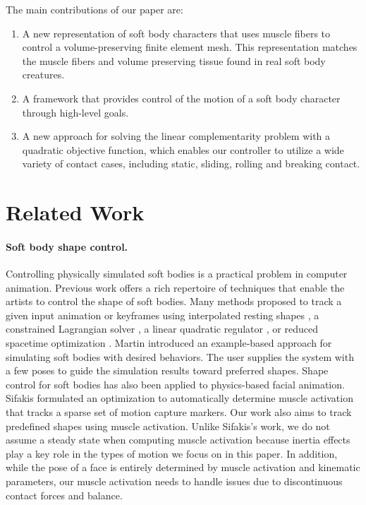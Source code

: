 The main contributions of our paper are:

\begin{enumerate}
\item A new representation of soft body characters that uses muscle fibers
to control a volume-preserving finite element mesh.  This representation
matches the muscle fibers and volume preserving tissue found in real soft
body creatures.
\item A framework that provides control of the motion of a
soft body character through high-level goals.
\item A new approach for solving the linear complementarity problem with a
quadratic objective function, which enables our controller to utilize a wide
variety of contact cases, including static, sliding, rolling and breaking
contact.
\end{enumerate}

\section{Related Work}

\paragraph{Soft body shape control.} Controlling physically simulated soft bodies is a practical problem in
computer animation. Previous work offers a rich repertoire of
techniques that enable the artists to control the shape of soft
bodies. Many methods proposed to track a given input animation or
keyframes using interpolated resting shapes \cite{Kondo:2005}, a
constrained Lagrangian solver \cite{Bergou:2007}, a linear quadratic
regulator \cite{Barbic:2008}, or reduced spacetime optimization
\cite{Barbic:2009}. Martin \etal \cite{Martin:2011} introduced an
example-based approach for simulating soft bodies with desired
behaviors. The user supplies the system with a few poses to guide the
simulation results toward preferred shapes. Shape control for soft
bodies has also been applied to physics-based facial
animation. Sifakis \cite{Sifakis:2005} formulated an optimization
to automatically determine muscle activation that tracks a sparse set
of motion capture markers. Our work also aims to track predefined
shapes using muscle activation. Unlike Sifakis's work, we do not
assume a steady state when computing muscle activation because inertia
effects play a key role in the types of motion we focus on in this
paper. In addition, while the pose of a face is entirely determined by
muscle activation and kinematic parameters, our muscle activation
needs to handle issues due to discontinuous contact forces and
balance.

